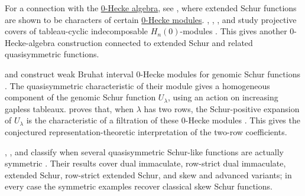 For a connection with the \hyperref[zeroHeckeAlgebra]{0-Hecke algebra}, see
\cite{Searles2020}, where extended Schur functions are shown to be characters
of certain
\hyperref[zeroHeckeAlgebra]{0-Hecke modules}.
, , , and
 study projective covers of tableau-cyclic
indecomposable $H_n(0)$-modules \cite{ChoiKimNamOh2020}.  This gives another
$0$-Hecke-algebra construction connected to extended Schur and related
quasisymmetric functions.

 and  construct weak Bruhat interval
$0$-Hecke modules for genomic Schur functions \cite{KimYoo2024}.  The
quasisymmetric characteristic of their module gives a homogeneous component of
the genomic Schur function $U_\lambda$, using an action on increasing gapless
tableaux.
 proves that, when $\lambda$ has two rows, the
Schur-positive expansion of $U_\lambda$ is the characteristic of a filtration
of these $0$-Hecke modules \cite{Kim2026xGenomicSchur}.  This gives the
conjectured representation-theoretic interpretation of the two-row
coefficients.

, , and
 classify when several quasisymmetric
Schur-like functions are actually symmetric
\cite{EsipovaLiangWilligenburg2025x}.  Their results cover dual immaculate,
row-strict dual immaculate, extended Schur, row-strict extended Schur, and
skew and advanced variants; in every case the symmetric examples recover
classical skew Schur functions.
